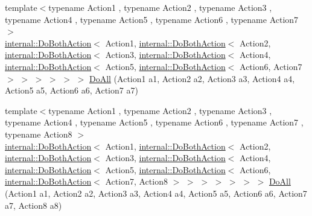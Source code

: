 \begin{DoxyCompactItemize}
\item 
{\footnotesize template$<$typename Action1 , typename Action2 , typename Action3 , typename Action4 , typename Action5 , typename Action6 , typename Action7 $>$ }\\\hyperlink{classtesting_1_1internal_1_1DoBothAction}{internal\+::\+Do\+Both\+Action}$<$ Action1, \hyperlink{classtesting_1_1internal_1_1DoBothAction}{internal\+::\+Do\+Both\+Action}$<$ Action2, \hyperlink{classtesting_1_1internal_1_1DoBothAction}{internal\+::\+Do\+Both\+Action}$<$ Action3, \hyperlink{classtesting_1_1internal_1_1DoBothAction}{internal\+::\+Do\+Both\+Action}$<$ Action4, \hyperlink{classtesting_1_1internal_1_1DoBothAction}{internal\+::\+Do\+Both\+Action}$<$ Action5, \hyperlink{classtesting_1_1internal_1_1DoBothAction}{internal\+::\+Do\+Both\+Action}$<$ Action6, Action7 $>$ $>$ $>$ $>$ $>$ $>$ \hyperlink{namespacetesting_aadfaf4eb9897dcabe067b1d882febc86}{Do\+All} (Action1 a1, Action2 a2, Action3 a3, Action4 a4, Action5 a5, Action6 a6, Action7 a7)
\item 
{\footnotesize template$<$typename Action1 , typename Action2 , typename Action3 , typename Action4 , typename Action5 , typename Action6 , typename Action7 , typename Action8 $>$ }\\\hyperlink{classtesting_1_1internal_1_1DoBothAction}{internal\+::\+Do\+Both\+Action}$<$ Action1, \hyperlink{classtesting_1_1internal_1_1DoBothAction}{internal\+::\+Do\+Both\+Action}$<$ Action2, \hyperlink{classtesting_1_1internal_1_1DoBothAction}{internal\+::\+Do\+Both\+Action}$<$ Action3, \hyperlink{classtesting_1_1internal_1_1DoBothAction}{internal\+::\+Do\+Both\+Action}$<$ Action4, \hyperlink{classtesting_1_1internal_1_1DoBothAction}{internal\+::\+Do\+Both\+Action}$<$ Action5, \hyperlink{classtesting_1_1internal_1_1DoBothAction}{internal\+::\+Do\+Both\+Action}$<$ Action6, \hyperlink{classtesting_1_1internal_1_1DoBothAction}{internal\+::\+Do\+Both\+Action}$<$ Action7, Action8 $>$ $>$ $>$ $>$ $>$ $>$ $>$ \hyperlink{namespacetesting_a2c0e69056a8e5bc4ddc2308ba0af5214}{Do\+All} (Action1 a1, Action2 a2, Action3 a3, Action4 a4, Action5 a5, Action6 a6, Action7 a7, Action8 a8)
\item 

\end{DoxyCompactItemize}
